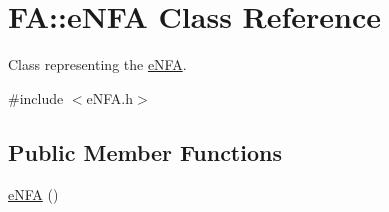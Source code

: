 \hypertarget{classFA_1_1eNFA}{\section{F\-A\-:\-:e\-N\-F\-A Class Reference}
\label{classFA_1_1eNFA}
}


Class representing the \hyperlink{classFA_1_1eNFA}{e\-N\-F\-A}.  




{\ttfamily \#include $<$e\-N\-F\-A.\-h$>$}

\subsection*{Public Member Functions}
\begin{DoxyCompactItemize}
\item 
\hypertarget{classFA_1_1eNFA_af93b9f2a5814595aaea7a498678f61c7}{\hyperlink{classFA_1_1eNFA_af93b9f2a5814595aaea7a498678f61c7}{e\-N\-F\-A} ()}\label{classFA_1_1eNFA_af93b9f2a5814595aaea7a498678f61c7}


\end{DoxyCompactItemize}
